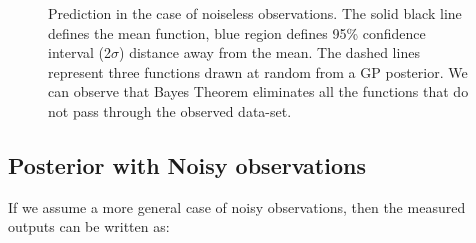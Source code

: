 \begin{figure}[!ht]
  \centering
    \quad
{}\quad
  
       \caption{Prediction in the case of noiseless observations. The solid black line defines the mean function, blue region defines 95\% confidence interval (2$\sigma$) distance away from the mean. The dashed lines represent three functions drawn at random from a GP posterior. We can observe that Bayes Theorem eliminates all the functions that do not pass through the observed data-set.}
       \label{figGPNoiseLessPosteriors}
\end{figure}



\subsection{Posterior with Noisy observations}\label{subSecPosteriorNoisy}
If we assume a more general case of noisy observations, then the measured outputs can be written as:

